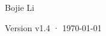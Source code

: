 \begin{titlepage}
\vfill
{\LARGE\sffamily Bojie Li\par}
\vspace{0.7cm}
{\small\sffamily\color{structurecolor!80} Version v1.4 · \today\par}
\vspace{1.2cm}
\end{titlepage}
